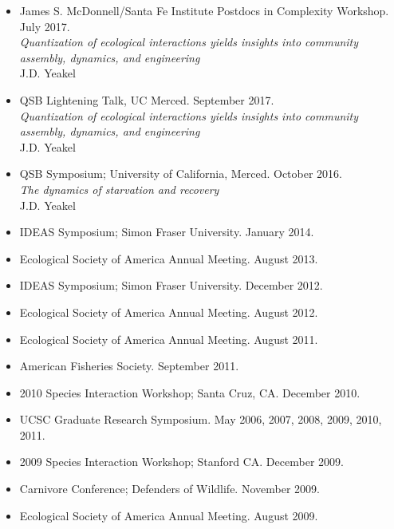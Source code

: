 \documentclass[margin,line,12pt]{res}
\begin{document}
\begin{resume}
\begin{itemize}
\item James S. McDonnell/Santa Fe Institute Postdocs in Complexity Workshop. July 2017.\\
\emph{Quantization of ecological interactions yields insights into community assembly, dynamics, and engineering}\\
J.D. Yeakel

\item QSB Lightening Talk, UC Merced. September 2017.\\
\emph{Quantization of ecological interactions yields insights into community assembly, dynamics, and engineering}\\
J.D. Yeakel

\item QSB Symposium; University of California, Merced. October 2016.\\
\emph{The dynamics of starvation and recovery}\\
J.D. Yeakel

\item IDEAS Symposium; Simon Fraser University. January 2014.

\item Ecological Society of America Annual Meeting. August 2013.

\item IDEAS Symposium; Simon Fraser University. December 2012.

\item Ecological Society of America Annual Meeting. August 2012.

\item Ecological Society of America Annual Meeting. August 2011.

\item American Fisheries Society. September 2011.

\item 2010 Species Interaction Workshop; Santa Cruz, CA. December 2010.

\item UCSC Graduate Research Symposium. May 2006, 2007, 2008, 2009, 2010, 2011.

\item 2009 Species Interaction Workshop; Stanford CA. December 2009.

\item Carnivore Conference; Defenders of Wildlife. November 2009.

\item Ecological Society of America Annual Meeting. August 2009.


\end{itemize}
\end{resume}
\end{document}
